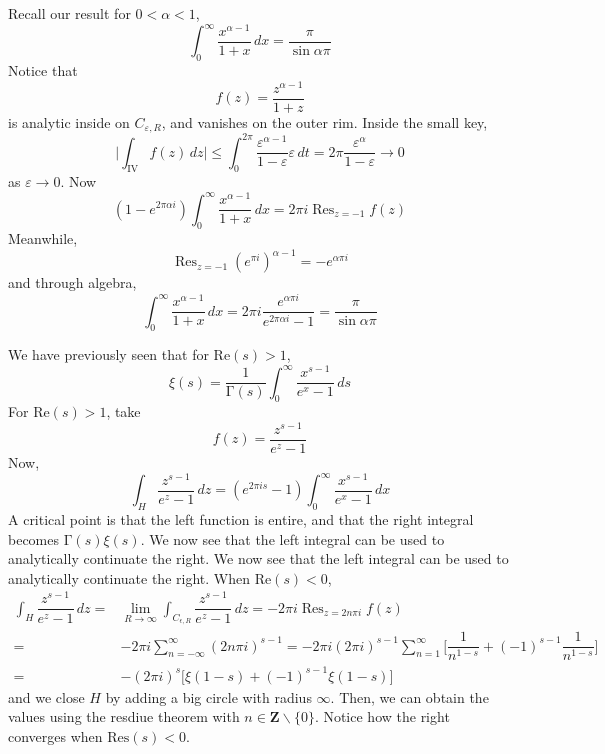 \vspace{2ex}
\begin{ex}
Recall our result for $0<\alpha <1$,
\[\int ^{\infty }_{0}\dfrac{x^{\alpha -1}}{1+x}\,dx=\dfrac{\pi }{\sin \alpha \pi }\]
Notice that 
\[f(z)=\dfrac{z^{\alpha -1}}{1+z}\]
is analytic inside on $C_{\varepsilon ,R}$, and vanishes on the outer rim. Inside the small key,
\[\Big|\int _{\mathrm{IV}}f(z)\,dz\Big|\leq \int ^{2\pi }_{0}\dfrac{\varepsilon  ^{\alpha -1}}{1-\varepsilon }\varepsilon \,dt=2\pi \dfrac{\varepsilon ^{\alpha }}{1-\varepsilon }\rightarrow 0\]
as $\varepsilon \rightarrow 0$. Now
\[(1-e^{2\pi \alpha i})\int ^{\infty }_{0}\dfrac{x^{\alpha -1}}{1+x}\,dx=2\pi i\mathop{\mathrm{Res}}_{z=-1}f(z)\]
Meanwhile,
\[\mathop{\mathrm{Res}}_{z=-1}(e^{\pi i})^{\alpha -1}=-e^{\alpha \pi i}\]
and through algebra,
\[\int ^{\infty }_{0}\dfrac{x^{\alpha -1}}{1+x}\,dx=2\pi i\dfrac{e^{\alpha \pi i}}{e^{2\pi \alpha i}-1}=\dfrac{\pi }{\sin \alpha \pi }\]
\end{ex}
\vspace{2ex}
\begin{recall}
We have previously seen that for $\mathrm{Re}(s)>1$,
\[\xi (s)=\dfrac{1}{\mathrm{\Gamma} (s)}\int ^{\infty }_{0}\dfrac{x^{s-1}}{e^{x}-1}\,ds\]
For $\mathrm{Re}(s)>1$, take
\[f(z)=\dfrac{z^{s-1}}{e^{z}-1}\]
Now,
\[\int _{H}\dfrac{z^{s-1}}{e^{z}-1}\,dz=(e^{2\pi is}-1)\int ^{\infty }_{0}\dfrac{x^{s-1}}{e^{x}-1}\,dx\]
A critical point is that the left function is entire, and that the right integral becomes $\mathrm{\Gamma} (s)\xi (s)$. We now see that the left integral can be used to analytically continuate the right. We now see that the left integral can be used to analytically continuate the right. When $\mathrm{Re}(s)<0$,
\[\begin{align*}
\int _{H}\dfrac{z^{s-1}}{e^{z}-1}\,dz=&\lim _{R\rightarrow \infty }\int _{C_{\epsilon ,R}}\dfrac{z^{s-1}}{e^{z}-1}\,dz=-2\pi i\mathop{\mathrm{Res}}_{z=2n\pi i}f(z)\\=&-2\pi i\sum ^{\infty }_{n=-\infty }(2n\pi i)^{s-1}=-2\pi i (2\pi i)^{s-1}\sum ^{\infty }_{n=1}\Big[\dfrac{1}{n^{1-s}}+(-1)^{s-1}\dfrac{1}{n^{1-s}}\Big]\\
=&-(2\pi i)^{s}\Big[\xi (1-s)+(-1)^{s-1}\xi (1-s)\Big]
\end{align*}\]
and we close $H$ by adding a big circle with radius $\infty $. Then, we can obtain the values using the resdiue theorem with $n\in {\bm Z}\backslash \{0\}$. Notice how the right converges when $\mathrm{Res}(s)<0$. 
\end{recall}
\vspace{2ex}
